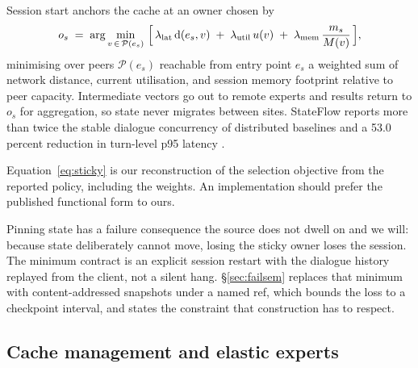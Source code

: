 \documentclass[11pt]{article}
\begin{document}
Session start anchors the cache at an owner chosen by
\begin{equation}
o_s \;=\; \arg\min_{v\,\in\,\mathcal{P}(e_s)}\ \Bigl[\,\lambda_{\text{lat}}\,\mathrm{d}(e_s,v) \;+\; \lambda_{\text{util}}\,u(v) \;+\; \lambda_{\text{mem}}\,\frac{m_s}{M(v)}\,\Bigr],
\label{eq:sticky}
\end{equation}
minimising over peers $\mathcal{P}(e_s)$ reachable from entry point $e_s$ a weighted sum of network distance, current utilisation, and session memory footprint relative to peer capacity. Intermediate vectors go out to remote experts and results return to $o_s$ for aggregation, so state never migrates between sites. StateFlow reports more than twice the stable dialogue concurrency of distributed baselines and a 53.0 percent reduction in turn-level p95 latency \cite{stateflow2026}.

Equation~\eqref{eq:sticky} is our reconstruction of the selection objective from the reported policy, including the weights. An implementation should prefer the published functional form to ours.

Pinning state has a failure consequence the source does not dwell on and we will: because state deliberately cannot move, losing the sticky owner loses the session. The minimum contract is an explicit session restart with the dialogue history replayed from the client, not a silent hang. \S\ref{sec:failsem} replaces that minimum with content-addressed snapshots under a named ref, which bounds the loss to a checkpoint interval, and states the constraint that construction has to respect.

\subsection{Cache management and elastic experts}
\end{document}
